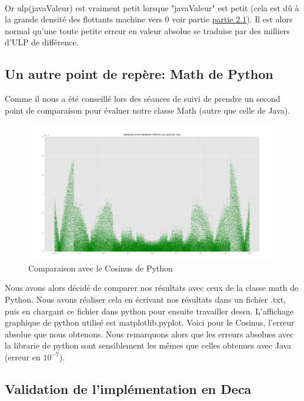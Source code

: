 \documentclass[12pt]{article}
\begin{document}
\\
\noindent Or ulp(javaValeur) est vraiment petit lorsque "javaValeur" est petit (cela est dû à la grande densité des flottants machine vers 0 voir partie \hyperref[sec:notions]{partie 2.1}).
Il est alors normal qu'une toute petite erreur en valeur absolue se traduise par des milliers d'ULP de différence.



\subsection{Un autre point de repère: Math de Python}

Comme il nous a été conseillé lors des séances de suivi de prendre un second point de comparaison pour évaluer notre classe Math (autre que celle de Java).

\begin{figure}[h!]
  \begin{center}
    \includegraphics[scale=0.2]{ErrorAbsCosPython.png}
    \caption{Comparaison avec le Cosinus de Python}
    \label{Comparaison avec le Cosinus de Python}
  \end{center}
\end{figure}

Nous avons alors décidé de comparer nos résultats avec ceux de la classe math de Python. Nous avons réaliser cela en écrivant nos résultats dans un fichier .txt, puis
en chargant ce fichier dans python pour ensuite travailler dessu. L'affichage graphique de python utilisé est matplotlib.pyplot. Voici pour le Cosinus, l'erreur absolue que
nous obtenons. Nous remarquons alors que les erreurs absolues avec la librarie de python sont sensiblement les mêmes que celles obtenues avec Java (erreur en $10^{-7}$).


\subsection{Validation de l'implémentation en Deca}
\end{document}
